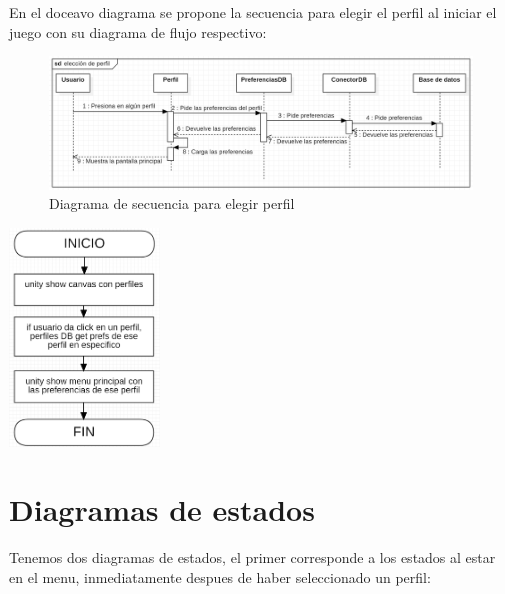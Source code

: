 \documentclass[12pt, oneside, letterpaper]{book}
\begin{document}
\bigskip
\fontsize{14}{18}\selectfont
\par 
En el doceavo diagrama se propone la secuencia para elegir el perfil al iniciar el juego con su diagrama de flujo respectivo:

\begin{figure}[h]
    \begin{flushleft}
        \includegraphics[width=1.3\textwidth]{DSFNElegirPerfil.png}
        \caption{Diagrama de secuencia para elegir perfil}
        \label{DSFNC}
    \end{flushleft}
\end{figure}


\begin{center}
	\centering
		\includegraphics[width=0.3\textwidth]{DFFNElegirPerfil.png}

	\caption{Diagrama de flujo para elegir el perfil}
	\label{DSFNC}
\end{center}
\bigskip
\section{Diagramas de estados}
\par 
Tenemos dos diagramas de estados, el primer corresponde a los estados al estar en el menu, inmediatamente despues de haber seleccionado un perfil: 
\end{document}
